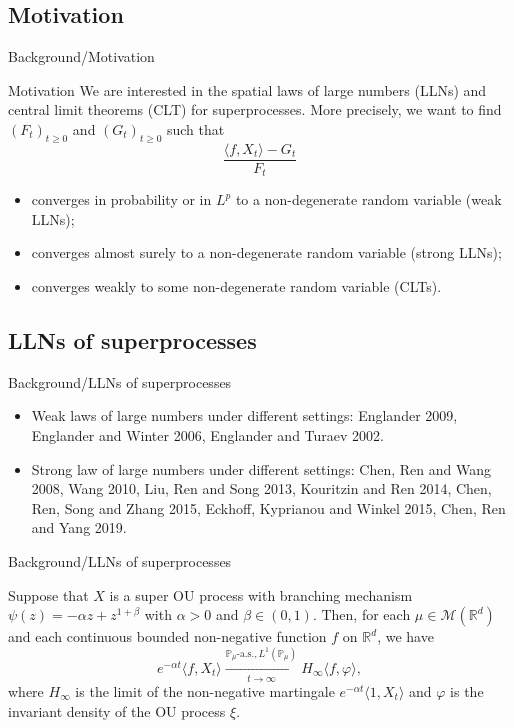 \documentclass[xcolor=dvipsnames]{beamer}
\begin{document}
\subsection{Motivation}

\begin{frame}{Background/Motivation}
  \begin{block}{Motivation}
    We are interested in the spatial laws of large numbers (LLNs) and central limit theorems (CLT) for superprocesses.
    More precisely, we want to find
    $(F_t)_{t\geq 0}$ and $(G_t)_{t\geq 0}$ such that
    \[
      \frac{\langle f, X_t \rangle -G_t}{F_t}
    \]
\begin{itemize}
\item
converges in probability or in $L^p$ to a non-degenerate random variable (weak LLNs);
\item
converges almost surely to a non-degenerate random variable (strong LLNs);
\item
converges weakly to some non-degenerate random variable (CLTs).
\end{itemize}
  \end{block}
\end{frame}

\subsection{LLNs of superprocesses}
\begin{frame}{Background/LLNs of superprocesses}
\begin{itemize}
\item
{\color{red}Weak laws of large numbers} under different settings: Englander 2009, Englander and Winter 2006, Englander  and Turaev 2002.
\item
{\color{red}Strong law of large numbers} under different settings: Chen, Ren and Wang 2008, Wang 2010, Liu, Ren and Song 2013, Kouritzin and  Ren 2014, Chen, Ren, Song and Zhang 2015, Eckhoff, Kyprianou and Winkel 2015, Chen, Ren and Yang 2019.
\end{itemize}
\end{frame}

\begin{frame}{Background/LLNs of superprocesses}
\begin{example}
	Suppose that $X$ is a super OU process with branching mechanism $\psi(z)=-\alpha z+ z^{1+\beta}$ with $\alpha>0$ and $\beta \in (0,1)$. Then, for each $\mu \in \mathcal M(\mathbb R^d)$ and each continuous bounded non-negative function $f$ on $\mathbb R^d$, we have
\[
	e^{-\alpha t} \langle f, X_t\rangle \xrightarrow[t\to \infty]{\mathbb P_\mu \text{-a.s.}, L^1(\mathbb P_\mu)} H_\infty \langle f, \varphi\rangle,
\]
	where $H_\infty$ is the limit of the non-negative martingale $e^{-\alpha t}\langle 1,X_t\rangle$ and $\varphi$ is the invariant density of the OU process $\xi$.
\end{example}
\end{frame}
\end{document}
